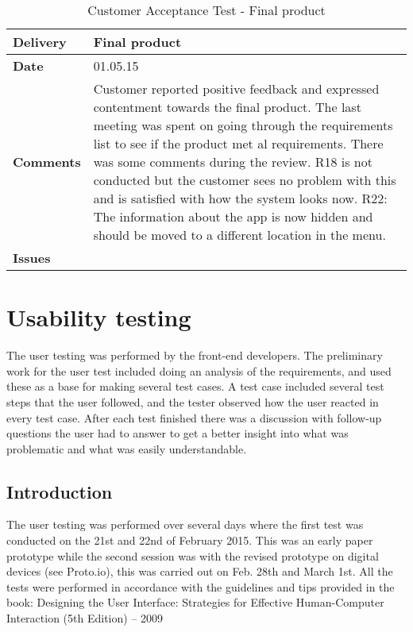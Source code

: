 \begin{center}
\begin{longtable}{ | p{4cm} | p{13cm} | }
		
		
	\end{longtable}
\end{center}

\renewcommand{\arraystretch}{2}%
\begin{center}
	\begin{longtable}{ | p{4cm} | p{13cm} | }
		
		\caption[Customer Acceptance Test - Final product]{Customer Acceptance Test - Final product} \label{Tab:cattest5}\\
		\hline
		\textbf{Delivery} & Final product\\ \hline
		\textbf{Date} & 01.05.15 \\ \hline
		\textbf{Comments} & Customer reported positive feedback and expressed contentment towards the final product.  The last meeting was spent on going through the requirements list to see if the product met al requirements. There was some comments during the review. 
		R18 is not conducted but the customer sees no problem with this and is satisfied with how the system looks now. 
		R22: The information about the app is now hidden and should be moved to a different location in the menu.   \\ \hline
		\textbf{Issues} \\ \hline
	\end{longtable}
\end{center}

\section{Usability testing}

The user testing was performed by the front-end developers. The preliminary work for the user test included doing an analysis of the requirements, and used these as a base for making several test cases. 
A test case included several test steps that the user followed, and the tester observed how the user reacted in every test case. After each test finished there was a discussion with follow-up questions the user had to answer to get a better insight into what was problematic and what was easily understandable. 

\subsection{Introduction}
The user testing was performed over several days where the first test was conducted on the 21st and 22nd of February 2015. This was an early paper prototype while the second session was with the revised prototype on digital devices (see Proto.io), this was carried out on Feb. 28th and March 1st. All the tests were performed in accordance with the guidelines and tips provided in the book: Designing the User Interface: Strategies for Effective Human-Computer Interaction (5th Edition) – 2009 


